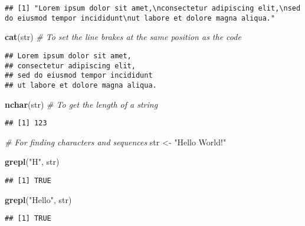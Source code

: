 \documentclass[
]{article}
\newenvironment{Shaded}{\begin{snugshade}}{\end{snugshade}}
\newcommand{\CommentTok}[1]{\textcolor[rgb]{0.56,0.35,0.01}{\textit{#1}}}
\newcommand{\FunctionTok}[1]{\textcolor[rgb]{0.13,0.29,0.53}{\textbf{#1}}}
\newcommand{\NormalTok}[1]{#1}
\newcommand{\OtherTok}[1]{\textcolor[rgb]{0.56,0.35,0.01}{#1}}
\newcommand{\StringTok}[1]{\textcolor[rgb]{0.31,0.60,0.02}{#1}}
\begin{document}
\begin{verbatim}
## [1] "Lorem ipsum dolor sit amet,\nconsectetur adipiscing elit,\nsed do eiusmod tempor incididunt\nut labore et dolore magna aliqua."
\end{verbatim}

\begin{Shaded}
\begin{Highlighting}[]
\FunctionTok{cat}\NormalTok{(str) }\CommentTok{\# To set the line brakes at the same position as the code}
\end{Highlighting}
\end{Shaded}

\begin{verbatim}
## Lorem ipsum dolor sit amet,
## consectetur adipiscing elit,
## sed do eiusmod tempor incididunt
## ut labore et dolore magna aliqua.
\end{verbatim}

\begin{Shaded}
\begin{Highlighting}[]
\FunctionTok{nchar}\NormalTok{(str) }\CommentTok{\# To get the length of a string}
\end{Highlighting}
\end{Shaded}

\begin{verbatim}
## [1] 123
\end{verbatim}

\begin{Shaded}
\begin{Highlighting}[]
\CommentTok{\# For finding characters and sequences}
\NormalTok{str }\OtherTok{\textless{}{-}} \StringTok{"Hello World!"}

\FunctionTok{grepl}\NormalTok{(}\StringTok{"H"}\NormalTok{, str)}
\end{Highlighting}
\end{Shaded}

\begin{verbatim}
## [1] TRUE
\end{verbatim}

\begin{Shaded}
\begin{Highlighting}[]
\FunctionTok{grepl}\NormalTok{(}\StringTok{"Hello"}\NormalTok{, str)}
\end{Highlighting}
\end{Shaded}

\begin{verbatim}
## [1] TRUE
\end{verbatim}
\end{document}

